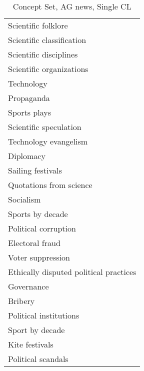 \begin{table*}[h]
\begin{minipage}{0.48\textwidth}
\begin{tabular}{|l|}
Scientific folklore \\
Scientific classification \\
Scientific disciplines \\
Scientific organizations \\
Technology \\
Propaganda \\
Sports plays \\
Scientific speculation \\
Technology evangelism \\
Diplomacy \\
Sailing festivals \\
Quotations from science \\
Socialism \\
Sports by decade \\
Political corruption \\
Electoral fraud \\
Voter suppression \\
Ethically disputed political practices \\
Governance \\
Bribery \\
Political institutions \\
Sport by decade \\
Kite festivals \\
Political scandals \\
\hline
\end{tabular}
\end{minipage}

\caption{Concept Set, AG news, Single CL}
\label{tab:ag4}
\end{table*}
